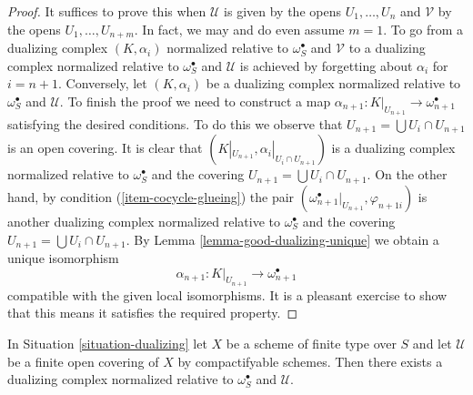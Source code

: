 \begin{proof}
It suffices to prove this when $\mathcal{U}$ is given by the opens
$U_1, \ldots, U_n$ and $\mathcal{V}$ by the opens $U_1, \ldots, U_{n + m}$.
In fact, we may and do even assume $m = 1$.
To go from a dualizing complex $(K, \alpha_i)$ normalized
relative to $\omega_S^\bullet$ and $\mathcal{V}$ to a
dualizing complex normalized relative to $\omega_S^\bullet$ and $\mathcal{U}$
is achieved by forgetting about $\alpha_i$ for $i = n + 1$. Conversely, let
$(K, \alpha_i)$ be a dualizing complex normalized relative to
$\omega_S^\bullet$ and $\mathcal{U}$.
To finish the proof we need to construct a map
$\alpha_{n + 1} : K|_{U_{n + 1}} \to \omega_{n + 1}^\bullet$ satisfying
the desired conditions.
To do this we observe that $U_{n + 1} = \bigcup U_i \cap U_{n + 1}$
is an open covering.
It is clear that $(K|_{U_{n + 1}}, \alpha_i|_{U_i \cap U_{n + 1}})$
is a dualizing complex normalized relative to $\omega_S^\bullet$
and the covering $U_{n + 1} = \bigcup U_i \cap U_{n + 1}$.
On the other hand, by condition (\ref{item-cocycle-glueing}) the pair
$(\omega_{n + 1}^\bullet|_{U_{n + 1}}, \varphi_{n + 1i})$
is another dualizing complex normalized relative to $\omega_S^\bullet$
and the covering
$U_{n + 1} = \bigcup U_i \cap U_{n + 1}$.
By Lemma \ref{lemma-good-dualizing-unique} we obtain a unique isomorphism
$$
\alpha_{n + 1} : K|_{U_{n + 1}} \longrightarrow \omega_{n + 1}^\bullet
$$
compatible with the given local isomorphisms.
It is a pleasant exercise to show that this means it satisfies
the required property.
\end{proof}

\begin{lemma}
\label{lemma-existence-good-dualizing}
In Situation \ref{situation-dualizing} let $X$ be a scheme of finite type
over $S$ and let $\mathcal{U}$ be a finite open covering
of $X$ by compactifyable schemes. Then there exists
a dualizing complex normalized relative to $\omega_S^\bullet$ and
$\mathcal{U}$.
\end{lemma}

